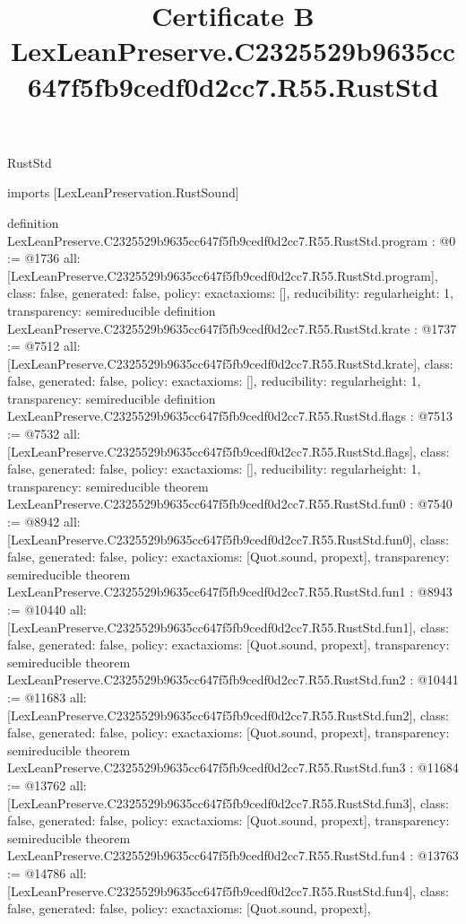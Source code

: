 \begin{lexlean}{RustStd}
\title{Certificate B LexLeanPreserve.C2325529b9635cc647f5fb9cedf0d2cc7.R55.RustStd}
\begin{coremodule}
imports [LexLeanPreservation.RustSound]

definition LexLeanPreserve.C2325529b9635cc647f5fb9cedf0d2cc7.R55.RustStd.program : @0 := @1736 {
  all: [LexLeanPreserve.C2325529b9635cc647f5fb9cedf0d2cc7.R55.RustStd.program],
  class: false,
  generated: false,
  policy: exact{axioms: []},
  reducibility: regular{height: 1},
  transparency: semireducible
}
definition LexLeanPreserve.C2325529b9635cc647f5fb9cedf0d2cc7.R55.RustStd.krate : @1737 := @7512 {
  all: [LexLeanPreserve.C2325529b9635cc647f5fb9cedf0d2cc7.R55.RustStd.krate],
  class: false,
  generated: false,
  policy: exact{axioms: []},
  reducibility: regular{height: 1},
  transparency: semireducible
}
definition LexLeanPreserve.C2325529b9635cc647f5fb9cedf0d2cc7.R55.RustStd.flags : @7513 := @7532 {
  all: [LexLeanPreserve.C2325529b9635cc647f5fb9cedf0d2cc7.R55.RustStd.flags],
  class: false,
  generated: false,
  policy: exact{axioms: []},
  reducibility: regular{height: 1},
  transparency: semireducible
}
theorem LexLeanPreserve.C2325529b9635cc647f5fb9cedf0d2cc7.R55.RustStd.fun0 : @7540 := @8942 {
  all: [LexLeanPreserve.C2325529b9635cc647f5fb9cedf0d2cc7.R55.RustStd.fun0],
  class: false,
  generated: false,
  policy: exact{axioms: [Quot.sound, propext]},
  transparency: semireducible
}
theorem LexLeanPreserve.C2325529b9635cc647f5fb9cedf0d2cc7.R55.RustStd.fun1 : @8943 := @10440 {
  all: [LexLeanPreserve.C2325529b9635cc647f5fb9cedf0d2cc7.R55.RustStd.fun1],
  class: false,
  generated: false,
  policy: exact{axioms: [Quot.sound, propext]},
  transparency: semireducible
}
theorem LexLeanPreserve.C2325529b9635cc647f5fb9cedf0d2cc7.R55.RustStd.fun2 : @10441 := @11683 {
  all: [LexLeanPreserve.C2325529b9635cc647f5fb9cedf0d2cc7.R55.RustStd.fun2],
  class: false,
  generated: false,
  policy: exact{axioms: [Quot.sound, propext]},
  transparency: semireducible
}
theorem LexLeanPreserve.C2325529b9635cc647f5fb9cedf0d2cc7.R55.RustStd.fun3 : @11684 := @13762 {
  all: [LexLeanPreserve.C2325529b9635cc647f5fb9cedf0d2cc7.R55.RustStd.fun3],
  class: false,
  generated: false,
  policy: exact{axioms: [Quot.sound, propext]},
  transparency: semireducible
}
theorem LexLeanPreserve.C2325529b9635cc647f5fb9cedf0d2cc7.R55.RustStd.fun4 : @13763 := @14786 {
  all: [LexLeanPreserve.C2325529b9635cc647f5fb9cedf0d2cc7.R55.RustStd.fun4],
  class: false,
  generated: false,
  policy: exact{axioms: [Quot.sound, propext]},
}
\end{coremodule}
\end{lexlean}
